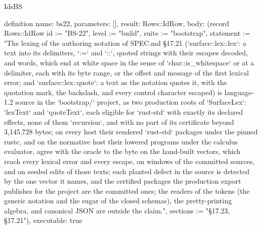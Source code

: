 \begin{lexlean}{IdsBS}
\begin{semanticmodule}
definition{
  name: bs22,
  parameters: [],
  result: Rows::IdRow,
  body: (record Rows::IdRow {id := "BS-22", level := "build", suite := "bootstrap", statement := "The lexing of the authoring notation of SPEC.md §17.21 (`surface::lex::lex`: a text into its delimiters, `:=` and `::`, quoted strings with their escapes decoded, and words, which end at white space in the sense of `char::is_whitespace` or at a delimiter, each with its byte range, or the offset and message of the first lexical error; and `surface::lex::quote`: a text as the notation quotes it, with the quotation mark, the backslash, and every control character escaped) is language-1.2 source in the `bootstrap/` project, as two production roots of `SurfaceLex`: `lexText` and `quoteText`, each eligible for `rust-std` with exactly its declared effects, none of them `recursion`, and with no part of its certificate beyond 3,145,728 bytes; on every host their rendered `rust-std` packages under the pinned rustc, and on the normative host their lowered programs under the calculus evaluator, agree with the oracle to the byte on the hand-built vectors, which reach every lexical error and every escape, on windows of the committed sources, and on seeded edits of those texts; each planted defect in the source is detected by the one vector it names, and the certified packages the production export publishes for the project are the committed ones; the readers of the tokens (the generic notation and the sugar of the closed schemas), the pretty-printing algebra, and canonical JSON are outside the claim.", sections := "§17.23, §17.21"}),
  executable: true
}


\end{semanticmodule}
\end{lexlean}
